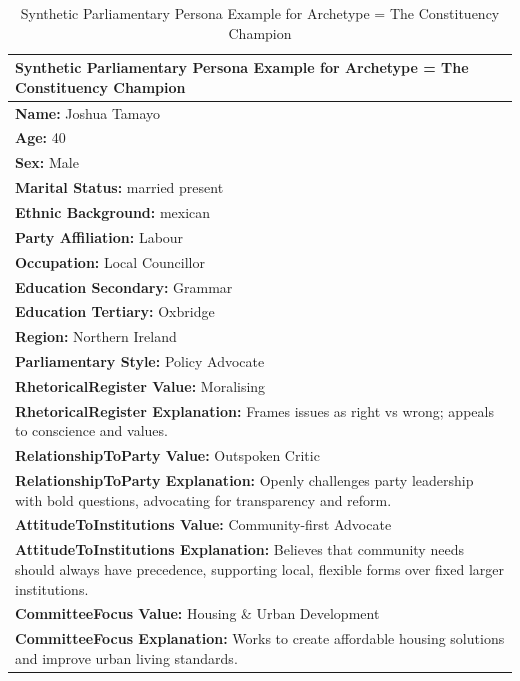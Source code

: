 \documentclass[11pt]{article}
\begin{document}
\begin{table}[ht]
\centering
\caption{Synthetic Parliamentary Persona Example for Archetype = The Constituency Champion}
\label{tab:parliamentry-persona-example-7}
\scriptsize %
\begin{tabularx}{\textwidth}{X}
\toprule
\textbf{Synthetic Parliamentary Persona Example for Archetype = The Constituency Champion} \\
\midrule
\textbf{Name:} Joshua Tamayo \\
\textbf{Age:} 40 \\
\textbf{Sex:} Male \\
\textbf{Marital Status:} married present \\
\textbf{Ethnic Background:} mexican \\
\textbf{Party Affiliation:} Labour \\
\textbf{Occupation:} Local Councillor \\
\textbf{Education Secondary:} Grammar \\
\textbf{Education Tertiary:} Oxbridge \\
\textbf{Region:} Northern Ireland \\
\textbf{Parliamentary Style:} Policy Advocate \\[4pt]

\textbf{RhetoricalRegister Value:} Moralising \\
\textbf{RhetoricalRegister Explanation:} Frames issues as right vs wrong; appeals to conscience and values. \\[4pt]

\textbf{RelationshipToParty Value:} Outspoken Critic \\
\textbf{RelationshipToParty Explanation:} Openly challenges party leadership with bold questions, advocating for transparency and reform. \\[4pt]

\textbf{AttitudeToInstitutions Value:} Community-first Advocate \\
\textbf{AttitudeToInstitutions Explanation:} Believes that community needs should always have precedence, supporting local, flexible forms over fixed larger institutions. \\[4pt]

\textbf{CommitteeFocus Value:} Housing \& Urban Development \\
\textbf{CommitteeFocus Explanation:} Works to create affordable housing solutions and improve urban living standards. \\[4pt]


\end{tabularx}
\end{table}
\end{document}
